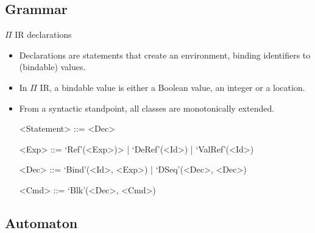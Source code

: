 \documentclass{beamer}
\begin{document}
\subsection{Grammar}


\begin{frame}{{\color{red}$\Pi$ IR} declarations}

\begin{itemize}
\item Declarations are statements that create an environment, binding identifiers to (bindable) values.
\item In {\color{red}$\Pi$ IR}, a bindable value is either a Boolean value, an integer or a location.
\item From a syntactic standpoint, all classes are monotonically extended.
\begin{grammar}
<Statement> ::= <Dec> 

<Exp>       ::=  `Ref'(<Exp>)> | `DeRef'(<Id>) | `ValRef'(<Id>)

<Dec>       ::= `Bind'(<Id>, <Exp>) | `DSeq'(<Dec>, <Dec>)

<Cmd>      ::= `Blk'(<Dec>, <Cmd>) 
\end{grammar}
\end{itemize}

\end{frame}

\subsection{Automaton}

\end{document}
